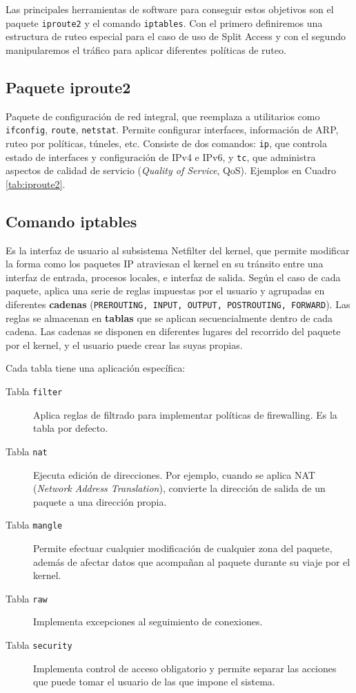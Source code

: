 Las principales herramientas de software para conseguir estos objetivos son el paquete \texttt{iproute2} y el comando \texttt{iptables}. Con el primero definiremos una estructura de ruteo especial para el caso de uso de Split Access y con el segundo manipularemos el tráfico para aplicar diferentes políticas de ruteo.

\subsection{Paquete iproute2}
Paquete de configuración de red integral, que reemplaza a utilitarios como \texttt{ifconfig}, \texttt{route}, \texttt{netstat}. Permite configurar interfaces, información de ARP, ruteo por políticas, túneles, etc. Consiste de dos comandos: \texttt{ip}, que controla estado de interfaces y configuración de IPv4 e IPv6, y \texttt{tc}, que administra aspectos de calidad de servicio (\textit{Quality of Service}, QoS). Ejemplos en Cuadro \ref{tab:iproute2}.

\subsection{Comando iptables}
Es la interfaz de usuario al subsistema Netfilter del kernel, que permite modificar la forma como los paquetes IP atraviesan el kernel en su tránsito entre una interfaz de entrada, procesos locales, e interfaz de salida. Según el caso de cada paquete, aplica una serie de reglas impuestas por el usuario y agrupadas en diferentes \textbf{cadenas} (\texttt{PREROUTING, INPUT, OUTPUT, POSTROUTING, FORWARD}). Las reglas se almacenan en \textbf{tablas} que se aplican secuencialmente dentro de cada cadena. Las cadenas se disponen en diferentes lugares del recorrido del paquete por el kernel, y el usuario puede crear las suyas propias. 

Cada tabla tiene una aplicación específica:

\begin{description}
	\item[Tabla \texttt{filter}] Aplica reglas de filtrado para implementar políticas de firewalling. Es la tabla por defecto.
	\item[Tabla \texttt{nat}] Ejecuta edición de direcciones. Por ejemplo, cuando se aplica NAT (\textit{Network Address Translation}), convierte la dirección de salida de un paquete a una dirección propia.
	\item[Tabla \texttt{mangle}] Permite efectuar cualquier modificación de cualquier zona del paquete, además de afectar datos que acompañan al paquete durante su viaje por el kernel. 
	\item[Tabla \texttt{raw}] Implementa excepciones al seguimiento de conexiones.
	\item[Tabla \texttt{security}] Implementa control de acceso obligatorio y permite separar las acciones que puede tomar el usuario de las que impone el sistema.
\end{description}


